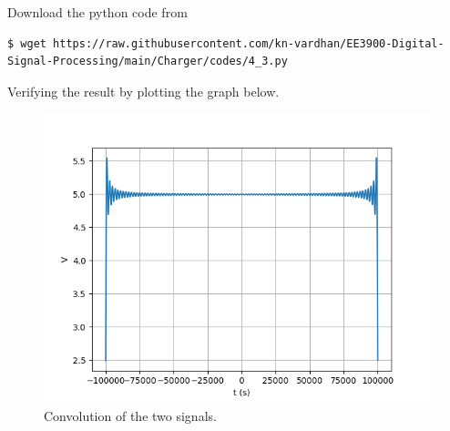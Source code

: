 \documentclass[journal,12pt,twocolumn]{IEEEtran}
\renewcommand\thesection{\arabic{section}}
\begin{document}
\begin{enumerate}[label=\thesection.\arabic*
,ref=\thesection.\theenumi]
\solution Download the python code from
\begin{lstlisting}
$ wget https://raw.githubusercontent.com/kn-vardhan/EE3900-Digital-Signal-Processing/main/Charger/codes/4_3.py
\end{lstlisting}
Verifying the result
by plotting the graph below.
\begin{figure}[!ht]
    \includegraphics[width=\columnwidth]{figs/4_3.png}
    \caption{Convolution of the two signals.}
    \label{eq:fig-conv}
\end{figure}
\end{enumerate}
\end{document}
